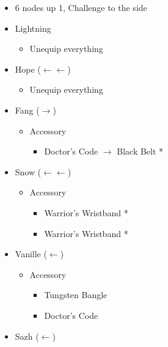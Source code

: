 \begin{menu}
\begin{multicols}{2}
\begin{itemize}
\begin{itemize}
\begin{itemize}
\begin{itemize}
                \item 6 nodes up 1, Challenge to the side
            \end{itemize}
        \end{itemize}
    \end{itemize}
    \columnbreak
    \equip
    \begin{itemize}
        \item Lightning
        \begin{itemize}
            \item Unequip everything
        \end{itemize}
        \item Hope ($\leftarrow\leftarrow$)
        \begin{itemize}
            \item Unequip everything
        \end{itemize}
        \item Fang ($\rightarrow$)
        \begin{itemize}
            \item Accessory
            \begin{itemize}
                \item Doctor's Code $\rightarrow$ Black Belt *
            \end{itemize}
        \end{itemize}
        \item Snow ($\leftarrow\leftarrow$)
        \begin{itemize}
            \item Accessory
            \begin{itemize}
                \item Warrior's Wristband *
                \item Warrior's Wristband *
            \end{itemize}
        \end{itemize}
        \item Vanille ($\leftarrow$)
        \begin{itemize}
            \item Accessory
            \begin{itemize}
                \item Tungsten Bangle
                \item Doctor's Code
            \end{itemize}
        \end{itemize}
        \item Sazh ($\leftarrow$)

\end{itemize}
\end{itemize}
\end{multicols}
\end{menu}
